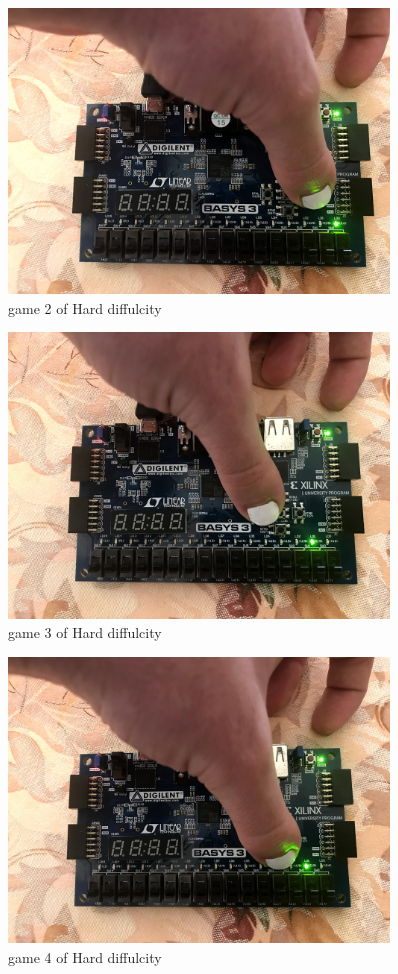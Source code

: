 \documentclass[11pt]{article}
\begin{document}
\clearpage
\begin{figure}

	
	\includegraphics[width=0.9\textwidth]{IMG_1302.jpg}
	\caption{game 2 of Hard diffulcity }
	\label{fig:sim_with_table}
\end{figure}
\begin{figure}
	\includegraphics[width=0.9\textwidth]{IMG_1303.jpg}
	\caption{game 3 of Hard diffulcity }
	\label{fig:sim_with_table}
\end{figure}
\begin{figure}
	\includegraphics[width=0.9\textwidth]{IMG_1304.jpg}
	\caption{game 4 of Hard diffulcity }
	\label{fig:sim_with_table}
\end{figure}
\end{document}
